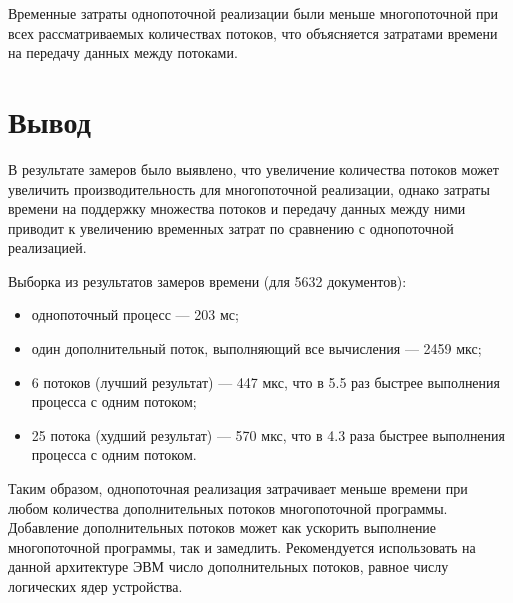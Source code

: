 Временные затраты однопоточной реализации были меньше многопоточной при всех рассматриваемых количествах потоков, что объясняется затратами времени на передачу данных между потоками.

\section{Вывод}
В результате замеров было выявлено, что увеличение количества потоков может увеличить производительность для многопоточной реализации, однако затраты времени на поддержку множества потоков и передачу данных между ними приводит к увеличению временных затрат по сравнению с однопоточной реализацией.

Выборка из результатов замеров времени (для 5632 документов):
\begin{itemize}
	\item однопоточный процесс --- 203 мс;
	\item один дополнительный поток, выполняющий все вычисления --- 2459 мкс;
	\item 6 потоков (лучший результат) — 447 мкс, что в 5.5 раз быстрее выполнения процесса с одним потоком;
	\item 25 потока (худший результат) — 570 мкс, что в 4.3 раза быстрее выполнения процесса с одним потоком.
\end{itemize}

Таким образом, однопоточная реализация затрачивает меньше времени при любом количества дополнительных потоков многопоточной программы.
Добавление дополнительных потоков может как ускорить выполнение многопоточной программы, так и замедлить.
Рекомендуется использовать на данной архитектуре ЭВМ число дополнительных потоков, равное числу логических ядер устройства.
